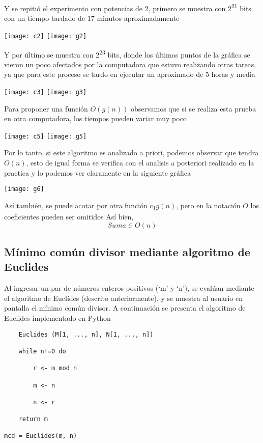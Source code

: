 \documentclass[12pt,twoside]{article}
\begin{document}
Y se repiti\'o el experimento con potencias de 2, primero se muestra con \texorpdfstring{2\textsuperscript{21}}{2 21} bits con un tiempo tardado de 17 minutos aproximadamente
\begin{center}
\texttt{[image: c2]}
\texttt{[image: g2]}
\end{center}
Y por \'ultimo se muestra con \texorpdfstring{2\textsuperscript{23}}{2 23} bits, donde los \'ultimos puntos de la gr\'afica se vieron un poco afectados por la computadora 
que estuvo realizando otras tareas, ya que para este proceso se tardo en ejecutar un aproximado de 5 horas y media
\begin{center}
\texttt{[image: c3]}
\texttt{[image: g3]}
\end{center}
Para proponer una función $O(g(n))$ observamos que si se realiza esta prueba en otra computadora, los tiempos pueden variar muy poco
\begin{center}
\texttt{[image: c5]}
\texttt{[image: g5]}
\end{center}
Por lo tanto, si este algoritmo es analizado a priori, podemos observar que tendra $O(n)$, esto de igual forma 
se verifica con el analisis a posteriori realizado en la practica y lo podemos ver claramente en la siguiente gráfica
\begin{center}
\texttt{[image: g6]}
\end{center}
Así también, se puede acotar por otra función \texorpdfstring{c\textsubscript{1}}{c 1}$g(n)$, pero en la notación $O$ los coeficientes pueden ser omitidos 
Así bien,
\[Suma \in O(n)\]

\subsection{M\'inimo com\'un divisor mediante algoritmo de Euclides}
Al ingresar un par de números enteros positivos (`m' y `n'), se evalúan mediante el algoritmo de Euclídes (descrito anteriormente), y se muestra al usuario en pantalla el mínimo común divisor. A continuación se presenta el algoritmo de Euclides 
implementado en Python 
\begin{lstlisting}
	Euclides (M[1, ..., n], N[1, ..., n])					
							
	while n!=0 do					
		
		r <- m mod n 				
					
		m <- n 					
		
		n <- r 					
	
	return m

mcd = Euclides(m, n)					
\end{lstlisting}
\end{document}
